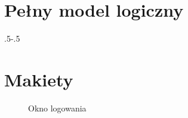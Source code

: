 \documentclass[a4paper,onecolumn,oneside,11pt,wide,floatssmall]{mwrep}
\theoremstyle{definition}
\theoremstyle{plain}%
\theoremstyle{remark}
\begin{document}

\appendix


\chapter{Pełny model logiczny}
\label{dodatek-model-logiczny}

 {\pdfpagewidth
    \vspace*{1cm}
    \noindent\kern.5\pdfpagewidth{}\kern-.5\pdfpagewidth
     \par
     \vspace*{-5cm}
\clearpage
}

\chapter{Makiety}
\label{dodatek-makiety}

\begin{figure}[H]
  \begin{center}
  \end{center}
  \caption{Okno logowania}
  \label{fig:mockups-login}
\end{figure}
\end{document}
